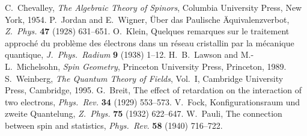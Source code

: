  C.~Chevalley, \emph{The Algebraic Theory of Spinors}, Columbia University Press, New York, 1954.
 P.~Jordan and E.~Wigner, \"Uber das Paulische \"Aquivalenzverbot, \emph{Z.\ Phys.} \textbf{47} (1928) 631--651.
 O.~Klein, Quelques remarques sur le traitement approch\'e du probl\`eme des \'electrons dans un r\'eseau cristallin par la m\'ecanique quantique, \emph{J.\ Phys.\ Radium} \textbf{9} (1938) 1--12.
 H.~B.~Lawson and M.-L.~Michelsohn, \emph{Spin Geometry}, Princeton University Press, Princeton, 1989.
 S.~Weinberg, \emph{The Quantum Theory of Fields}, Vol.~I, Cambridge University Press, Cambridge, 1995.
 G.~Breit, The effect of retardation on the interaction of two electrons, \emph{Phys.\ Rev.} \textbf{34} (1929) 553--573.
 V.~Fock, Konfigurationsraum und zweite Quantelung, \emph{Z.\ Phys.} \textbf{75} (1932) 622--647.
 W.~Pauli, The connection between spin and statistics, \emph{Phys.\ Rev.} \textbf{58} (1940) 716--722.
